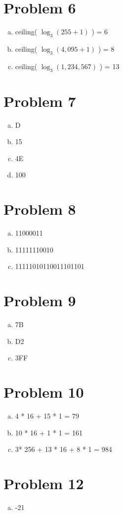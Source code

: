 \documentclass[11pt]{article}
\begin{document}
\section*{Problem 6}
\begin{enumerate}[(a)]
	\item ceiling( $\log _3 (255+1)$ ) = 6
	\item ceiling( $\log _3 (4,095+1)$ ) = 8
	\item ceiling( $\log _3 (1,234,567)$ ) = 13
\end{enumerate}

\section*{Problem 7}
\begin{enumerate}[(a)]
	\item D
	\item 15
	\item 4E
	\item 100
\end{enumerate}

\section*{Problem 8}
\begin{enumerate}[(a)]
	\item 11000011
	\item 11111110010
	\item 11111010110011101101
\end{enumerate}

\section*{Problem 9}
\begin{enumerate}[(a)]
	\item 7B
	\item D2
	\item 3FF
\end{enumerate}

\section*{Problem 10}
\begin{enumerate}[(a)]
	\item 4 * 16 + 15 * 1 = 79
	\item 10 * 16 + 1 * 1 = 161
	\item 3* 256 + 13 * 16 + 8 * 1 = 984
\end{enumerate}

\section*{Problem 12}
\begin{enumerate}[(a)]
	\item -21
\end{enumerate}
\end{document}
